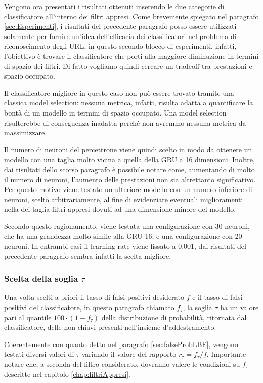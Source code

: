\documentclass[../../main.tex]{subfiles}
\begin{document}
    Vengono ora presentati i risultati ottenuti inserendo le due categorie di classificatore all'interno dei filtri appresi. Come brevemente spiegato nel paragrafo \ref{sec:Esperimenti}, i risultati del precedente paragrafo posso essere utilizzati solamente per fornire un'idea dell'efficacia dei classificatori nel problema di riconoscimento degli URL; in questo secondo blocco di esperimenti, infatti, l'obiettivo è trovare il classificatore che porti alla maggiore diminuzione in termini di spazio dei filtri. Di fatto vogliamo quindi cercare un tradeoff tra prestazioni e spazio occupato.

    Il classificatore migliore in questo caso non può essere trovato tramite una classica model selection: nessuna metrica, infatti, risulta adatta a quantificare la bontà di un modello in termini di spazio occupato. Una model selection risulterebbe di conseguenza inadatta perché non avremmo nessuna metrica da massimizzare.

    Il numero di neuroni del percettrone viene quindi scelto in modo da ottenere un modello con una taglia molto vicina a quella della GRU a 16 dimensioni. Inoltre, dai risultati dello scorso paragrafo è possibile notare come, aumentando di molto il numero di neuroni, l'aumento delle prestazioni non sia altrettanto significativo. Per questo motivo viene testato un ulteriore modello con un numero inferiore di neuroni, scelto arbitrariamente, al fine di evidenziare eventuali miglioramenti nella dei taglia filtri appresi dovuti ad una dimensione minore del modello.

    Secondo questo ragionamento, viene testata una configurazione con 30 neuroni, che ha una grandezza molto simile alla GRU 16, e una configurazione con 20 neuroni. In entrambi casi il learning rate viene fissato a 0.001, dai risultati del precedente paragrafo sembra infatti la scelta migliore.
    
    \subsubsection{Scelta della soglia $\tau$}
    Una volta scelti a priori il tasso di falsi positivi desiderato $f$ e il tasso di falsi positivi del classificatore, in questo paragrafo chiamato $f_{\tau}$, la soglia $\tau$ ha un valore pari al quantile $100 \cdot (1 - f_{\tau})$ della distribuzione di probabilità, ritornata dal classificatore, delle non-chiavi presenti nell'insieme d'addestramento.

    Coerentemente con quanto detto nel paragrafo \ref{sec:falseProbLBF}, vengono testati diversi valori di $\tau$ variando il valore del rapporto $r_{\tau} = f_{\tau}/f$. Importante notare che, a seconda  del filtro considerato, dovranno valere le condizioni su $f_{\tau}$ descritte nel capitolo \ref{chap:filtriAppresi}.
\end{document}
